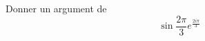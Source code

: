 Donner un argument de 
\begin{displaymath}
 \sin \frac{2\pi}{3}e^{\frac{2i\pi}{3}}
\end{displaymath}
\bigskip \bigskip